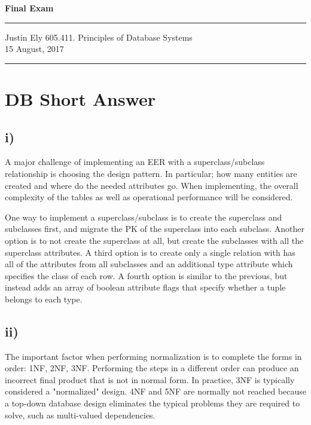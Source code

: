 \documentclass[a4paper,11pt]{article}
\begin{document}
\begin{flushright}

\vspace{1.1cm}

{\bf\Huge Final Exam}

\rule{0.25\linewidth}{0.5pt}

\vspace{0.5cm}
Justin Ely
\linebreak
\footnotesize{605.411. Principles of Database Systems \\}
15 August, 2017
\end{flushright}

\noindent\rule{\linewidth}{1.0pt}


\section{DB Short Answer}
\subsection*{i)}
A major challenge of implementing an EER with a superclass/subclass relationship is choosing the design pattern.  In particular; how many entities are created and where do the needed attributes go.  When implementing, the overall complexity of the tables as well as operational performance will be considered.  

One way to implement a superclass/subclass is to create the superclass and subclasses first, and migrate the PK of the superclass into each subclass.  Another option is to not create the superclass at all, but create the subclasses with all the superclass attributes.  A third option is to create only a single relation with has all of the attributes from all subclasses and an additional type attribute which specifies the class of each row.  A fourth option is similar to the previous, but instead adds an array of boolean attribute flags that specify whether a tuple belongs to each type.

\subsection*{ii)}
The important factor when performing normalization is to complete the forms in order: 1NF, 2NF, 3NF.  Performing the steps in a different order can produce an incorrect final product that is not in normal form.  In practice, 3NF is typically considered a "normalized" design.  4NF and 5NF are normally not reached because a top-down database design eliminates the typical problems they are required to solve, such as multi-valued dependencies.
\end{document}
